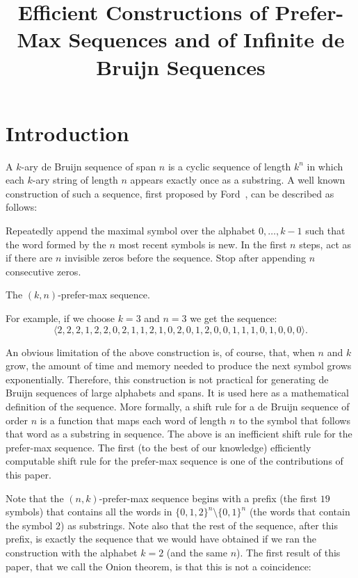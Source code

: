 \documentclass{article} %
\title{Efficient Constructions of Prefer-Max Sequences and of Infinite de Bruijn
	Sequences}
\author{}
\theoremstyle{definition} \newtheorem{definition}[theorem]{Definition}
\begin{document}
 \maketitle
	
	\section{Introduction}
	
	A $k$-ary de Bruijn sequence of span $n$ is a cyclic sequence of length $k^n$
	in which each $k$-ary string of length $n$ appears exactly once as a substring.
	A well known construction of such a sequence, first proposed by
	Ford~\cite{Ford1957}, can be described as follows:
	
	\begin{algorithm} Repeatedly append the maximal symbol over the alphabet
		$0,\dots,k-1$ such that the word formed by the $n$ most recent symbols is new.
		In the first $n$ steps, act as if there are $n$ invisible zeros before the
		sequence. Stop after appending $n$ consecutive zeros. \caption{The
			$(k,n)$-prefer-max sequence.} \label{pref-max} \end{algorithm}
	
	
	For example, if we choose $k=3$ and $n=3$ we get the sequence:
	$$\langle2,2,2,1,2,2,0,2,1,1,2,1,0,2,0,1,2,0,0,1,1,1,0,1,0,0,0\rangle.$$
	
	
	An obvious limitation of the above construction is, of course, that, when $n$
	and $k$ grow, the amount of time and memory needed to produce the next symbol
	grows exponentially. Therefore, this construction is not practical for
	generating de Bruijn sequences of large alphabets and spans. It is used here as
	a mathematical definition of the sequence. More formally, a shift rule for a de
	Bruijn sequence of order $n$ is a function that maps each word of length $n$ to
	the symbol that follows that word as a substring in sequence. The above is an
	inefficient shift rule for the prefer-max sequence. The first (to the best of
	our knowledge) efficiently computable shift rule for the prefer-max sequence is
	one of the contributions of this paper.
	
	Note that the $(n,k)$-prefer-max sequence begins with a prefix (the first $19$
	symbols) that contains all the words in $\{0,1,2\}^n \setminus \{0,1\}^n$  (the
	words that contain the symbol $2$) as substrings. Note also that the rest of
	the sequence, after this prefix, is exactly the sequence that we would have
	obtained if we ran the construction with the alphabet $k=2$ (and the same $n$).
	The first result of this paper, that we call the Onion theorem, is that this is
	not a coincidence:
	
\end{document}
